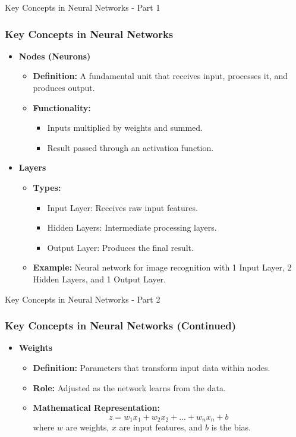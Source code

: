 \documentclass[aspectratio=169]{beamer}
\begin{document}
\begin{frame}[fragile]{Key Concepts in Neural Networks - Part 1}
  \frametitle{Key Concepts in Neural Networks}

  \begin{itemize}
    \item \textbf{Nodes (Neurons)}
    \begin{itemize}
      \item \textbf{Definition:} A fundamental unit that receives input, processes it, and produces output.
      \item \textbf{Functionality:}
      \begin{itemize}
        \item Inputs multiplied by weights and summed.
        \item Result passed through an activation function.
      \end{itemize}
    \end{itemize}
    
    \item \textbf{Layers}
    \begin{itemize}
      \item \textbf{Types:}
      \begin{itemize}
        \item Input Layer: Receives raw input features.
        \item Hidden Layers: Intermediate processing layers.
        \item Output Layer: Produces the final result.
      \end{itemize}
      \item \textbf{Example:} Neural network for image recognition with 1 Input Layer, 2 Hidden Layers, and 1 Output Layer.
    \end{itemize}
  \end{itemize}
\end{frame}

\begin{frame}[fragile]{Key Concepts in Neural Networks - Part 2}
  \frametitle{Key Concepts in Neural Networks (Continued)}

  \begin{itemize}
    \item \textbf{Weights}
    \begin{itemize}
      \item \textbf{Definition:} Parameters that transform input data within nodes.
      \item \textbf{Role:} Adjusted as the network learns from the data.
      \item \textbf{Mathematical Representation:}
      \begin{equation}
      z = w_1x_1 + w_2x_2 + ... + w_nx_n + b
      \end{equation}
      where \( w \) are weights, \( x \) are input features, and \( b \) is the bias.
    \end{itemize}
  \end{itemize}
\end{frame}
\end{document}
